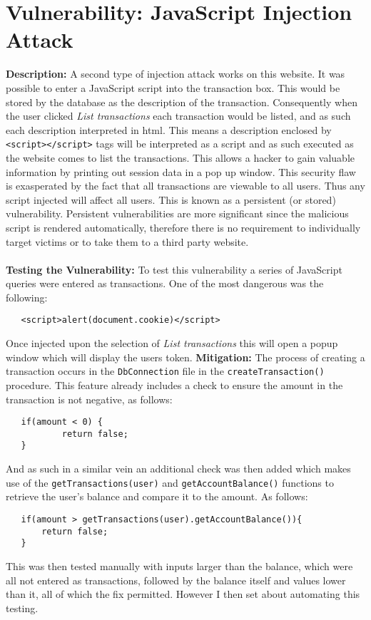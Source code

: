 \section{Vulnerability: JavaScript Injection Attack}
\label{sec:background}
\textbf{Description:} A second type of injection attack works on this website. It was possible to enter a JavaScript script into the transaction box. This would be stored by
the database as the description of the transaction. Consequently when the user clicked \textit{List transactions} each transaction would be listed, and as such each description
interpreted in html. This means a description enclosed by \verb|<script></script>| tags will be interpreted as a script and as such executed as the website comes to list the
transactions. This allows a hacker to gain valuable information by printing out session data in a pop up window. This security flaw is exasperated by the fact that all transactions
are viewable to all users. Thus any script injected will affect all users. This is known as a persistent (or stored) vulnerability. Persistent vulnerabilities are more significant
since the malicious script is rendered automatically, therefore there is no requirement to individually target victims or to take them to a third party website.\\ \\
\textbf{Testing the Vulnerability:} To test this vulnerability a series of JavaScript queries were entered as transactions. One of the most dangerous was the following:
\begin{verbatim}
   <script>alert(document.cookie)</script>
\end{verbatim}
Once injected upon the selection of \textit{List transactions} this will open a popup window which will display the users token.
\textbf{Mitigation:} The process of creating a transaction occurs in the \verb|DbConnection| file in the \verb|createTransaction()| procedure. This feature already
includes a check to ensure the amount in the transaction is not negative, as follows:
\begin{verbatim}
   if(amount < 0) {
           return false;
   }
\end{verbatim}
And as such in a similar vein an additional check was then added which makes use of the \verb|getTransactions(user)| and \verb|getAccountBalance()| functions to retrieve
the user's balance and compare it to the amount. As follows:
\begin{verbatim}
   if(amount > getTransactions(user).getAccountBalance()){
       return false;
   }
\end{verbatim}
This was then tested manually with inputs larger than the balance, which were all not entered as transactions, followed by the balance itself and values lower than it, all of
which the fix permitted. However I then set about automating this testing.
 
